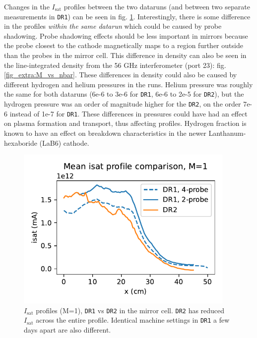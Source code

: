 Changes in the $I_\text{sat}$ profiles between the two dataruns (and between two separate measurements in \texttt{DR1}) can be seen in fig. \ref{fig_extra:DR1-DR2_isat_profile_comparison}. Interestingly, there is some difference in the profiles \emph{within the same datarun} which could be caused by probe shadowing. Probe shadowing effects should be less important in mirrors because the probe closest to the cathode magnetically maps to a region further outside than the probes in the mirror cell. This difference in density can also be seen in the line-integrated density from the 56 GHz interferometer (port 23): fig. \ref{fig_extra:M_vs_nbar}. These differences in density could also be caused by different hydrogen and helium pressures in the runs. Helium pressure was roughly the same for both dataruns (6e-6 to 3e-6 for \texttt{DR1}, 6e-6 to 2e-5 for \texttt{DR2}), but the hydrogen pressure was an order of magnitude higher for the \texttt{DR2}, on the order 7e-6 instead of 1e-7 for \texttt{DR1}. These differences in pressures could have had an effect on plasma formation and transport, thus affecting profiles. Hydrogen fraction is known to have an effect on breakdown characteristics in the newer Lanthanum-hexaboride (LaB6) cathode.
\begin{figure}
    \centering
    \includegraphics[width=300pt]{figures/extra/isat_profile_comparison.pdf}
    \caption[$I_\text{sat}$ profiles (M=1), \texttt{DR1} vs \texttt{DR2}]{$I_\text{sat}$ profiles (M=1), \texttt{DR1} vs \texttt{DR2} in the mirror cell. \texttt{DR2} has reduced $I_\text{sat}$ across the entire profile. Identical machine settings in \texttt{DR1} a few days apart are also different.}
    \label{fig_extra:DR1-DR2_isat_profile_comparison}
\end{figure}

